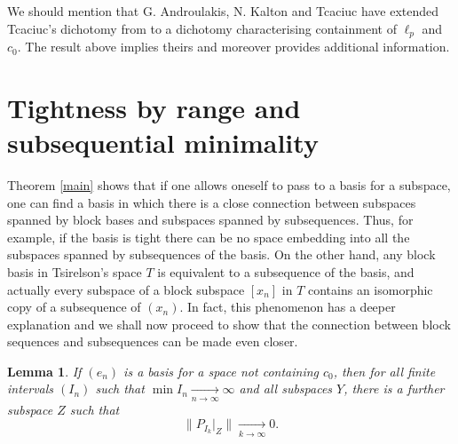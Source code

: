 \documentclass[10pt]{amsart}
\numberwithin{equation}{section}
\newtheorem{lemme}[thm]{Lemma}
\begin{document}
We should mention that G. Androulakis, N. Kalton and Tcaciuc \cite{T2} have extended Tcaciuc's dichotomy from \cite{T} to a
dichotomy characterising containment of $\ell_p$ and $c_0$. The result above implies theirs and moreover provides additional
information.

\section{Tightness by range and subsequential minimality}
Theorem \ref{main} shows that if one allows oneself to pass to a basis for a
subspace, one can find a basis in which there is  a close connection between
subspaces spanned by block bases and subspaces spanned by subsequences. Thus,
for example, if the basis is tight there can be no space embedding into all the
subspaces spanned by subsequences of the basis. On the other hand, any block
basis in Tsirelson's space $T$ is equivalent to a subsequence of the basis, and
actually every subspace of a block subspace $[x_n]$ in $T$  contains an
isomorphic copy of a subsequence of $(x_n)$.  In fact, this phenomenon has a
deeper explanation and we shall now proceed to show that the connection between
block sequences and subsequences  can be made even closer.

\begin{lemme}\label{flat subspaces}
If $(e_n)$ is a basis for a space not containing  $c_0$, then for all finite
intervals $(I_n)$ such that $\min I_n{\mathop{\longrightarrow}\limits_{{n{\rightarrow} \infty}}} \infty$ and all
subspaces $Y$, there is a further subspace $Z$ such that
$$
{\lVert{P_{I_k}|_ Z}\rVert}{\mathop{\longrightarrow}\limits_{{k{\rightarrow} \infty}}}0.
$$
\end{lemme}
\end{document}
